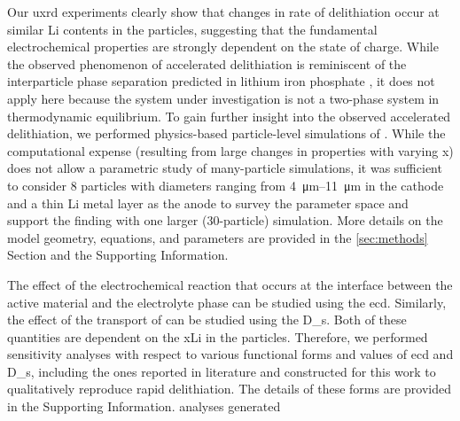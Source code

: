 \documentclass{article}
\begin{document}
Our \gls{uxrd} experiments clearly show that changes in rate of
delithiation occur at similar Li contents in the particles, suggesting
that the fundamental electrochemical properties are strongly dependent
on the state of charge. While the observed phenomenon of accelerated
delithiation is reminiscent of the interparticle phase separation
predicted in lithium iron phosphate , it does not apply
here because the system under investigation is not a two-phase system
in thermodynamic equilibrium. To gain further insight into the
observed accelerated delithiation, we performed physics-based
particle-level simulations of . While the computational expense
(resulting from large changes in properties with varying x) does not
allow a parametric study of many-particle simulations, it was
sufficient to consider 8 particles with diameters ranging from
\SIrange{4}{11}{\micro\meter} in the cathode and a thin Li metal layer
as the anode to survey the parameter space and support the finding
with one larger (30-particle) simulation. More details on the model
geometry, equations, and parameters are provided in the
\ref{sec:methods} Section and the Supporting Information.

The effect of the electrochemical reaction that occurs at the
interface between the active material and the electrolyte phase can be
studied using the \gls{ecd}. Similarly, the effect of the transport of
 can be studied using the \gls{D_s}. Both of these quantities
are dependent on the \gls{xLi} in the particles. Therefore, we
performed sensitivity analyses with respect to various functional
forms and values of \gls{ecd} and \gls{D_s}, including the ones
reported in literature and constructed for this work to
qualitatively reproduce rapid delithiation. The details of these forms
are provided in the Supporting Information. %
analyses generated
\end{document}
